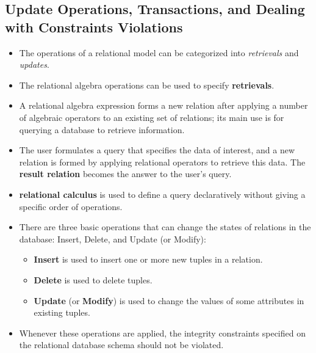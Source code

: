 \documentclass[10pt]{article}
\begin{document}
\subsection{Update Operations, Transactions, and Dealing with Constraints Violations}

\begin{itemize}
	\item The operations of a relational model can be categorized into \textit{retrievals} and \textit{updates}.
	\item The relational algebra operations can be used to specify \textbf{retrievals}.  
	\item A relational algebra expression forms a new relation after applying a number of algebraic operators to an existing set of relations; its main use is for querying a database to retrieve information.
	\item The user formulates a query that specifies the data of interest, and a new relation is formed by applying relational operators to retrieve this data. The \textbf{result relation} becomes the answer to the user's query.
	\item \textbf{relational calculus} is used to define a query declaratively without giving a specific order of operations.
	\item There are three basic operations that can change the states of relations in the database: Insert, Delete, and Update (or Modify):
	\begin{itemize}
		\item \textbf{Insert} is used to insert one or more new tuples in a relation.
		\item \textbf{Delete} is used to delete tuples.
		\item \textbf{Update} (or \textbf{Modify}) is used to change the values of some attributes in existing tuples.
	\end{itemize} 
	\item Whenever these operations are applied, the integrity constraints specified on the relational database schema should not be violated. 
\end{itemize}
\end{document}

